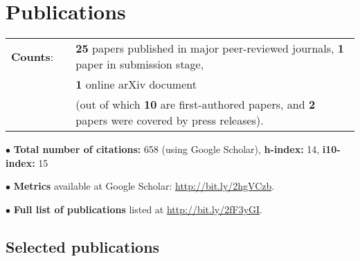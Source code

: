 \documentclass[11pt,letterpaper,sans]{moderncv}
\begin{document}
\vspace{-3mm}
\section{Publications}

\cvitem{}
{
\begin{tabular}{rcl}
\textbf{Counts}: &\hspace{0.3cm} &{\textbf{25} papers published in major peer-reviewed journals}, {\textbf{1} paper in submission stage,} \\
& &{\textbf{1} online arXiv document} \\
& &{(out of which \textbf{10} are first-authored papers, and \textbf{2} papers were covered by press releases).}
\end{tabular}
}

$\bullet$ \textbf{Total number of citations:} 658 (using Google Scholar), \textbf{h-index:} 14, \textbf{i10-index:} 15

$\bullet$ \textbf{Metrics} available at Google Scholar: {\color{color1} \href{http://bit.ly/2hgVCzb}{http://bit.ly/2hgVCzb}}.

$\bullet$ \textbf{Full list of publications} listed at {\color{color1} \href{http://bit.ly/2fF3yGI}{http://bit.ly/2fF3yGI}}.

\subsection{Selected publications}
\end{document}
